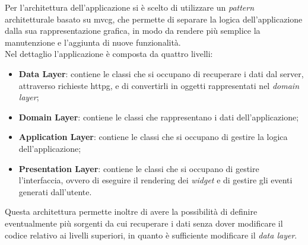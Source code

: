 Per l'architettura dell'applicazione si è scelto di utilizzare un \emph{pattern} architetturale basato su \gls{mvcg}\glsoccur, che permette di separare la logica dell'applicazione dalla sua rappresentazione grafica, in modo da rendere più semplice la manutenzione e l'aggiunta di nuove funzionalità.\\
Nel dettaglio l'applicazione è composta da quattro livelli:
\begin{itemize}
    \item \textbf{Data Layer}: contiene le classi che si occupano di recuperare i dati dal server, attraverso richieste \gls{httpg}\glsoccur, e di convertirli in oggetti rappresentati nel \emph{domain layer};
    \item \textbf{Domain Layer}: contiene le classi che rappresentano i dati dell'applicazione;
    \item \textbf{Application Layer}: contiene le classi che si occupano di gestire la logica dell'applicazione;
    \item \textbf{Presentation Layer}: contiene le classi che si occupano di gestire l'interfaccia, ovvero di eseguire il rendering dei \emph{widget} e di gestire gli eventi generati dall'utente.
\end{itemize}
Questa architettura permette inoltre di avere la possibilità di definire eventualmente più sorgenti da cui recuperare i dati senza dover modificare il codice relativo ai livelli superiori, in quanto è sufficiente modificare il \emph{data layer}\cite{site:app-architecture}.

